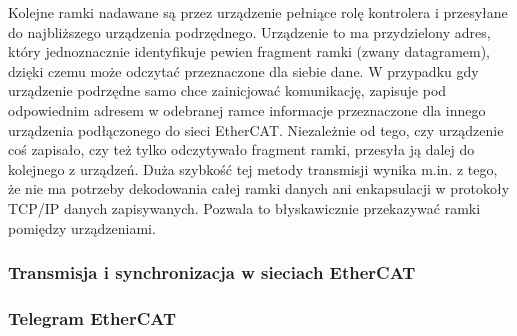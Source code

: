 Kolejne ramki nadawane są przez urządzenie pełniące rolę kontrolera i przesyłane do najbliższego urządzenia podrzędnego. Urządzenie to ma przydzielony adres, który jednoznacznie identyfikuje pewien fragment ramki (zwany datagramem), dzięki czemu może odczytać przeznaczone dla siebie dane. W przypadku gdy urządzenie podrzędne samo chce zainicjować komunikację, zapisuje pod odpowiednim adresem w odebranej ramce informacje przeznaczone dla innego urządzenia podłączonego do sieci EtherCAT. Niezależnie od tego, czy urządzenie coś zapisało, czy też tylko odczytywało fragment ramki, przesyła ją dalej do kolejnego z urządzeń. Duża szybkość tej metody transmisji wynika m.in. z tego, że nie ma potrzeby dekodowania całej ramki danych ani enkapsulacji w protokoły TCP/IP danych zapisywanych. Pozwala to błyskawicznie przekazywać ramki pomiędzy urządzeniami.



\subsubsection{Transmisja i synchronizacja w sieciach EtherCAT}


\subsubsection{Telegram EtherCAT}

